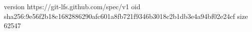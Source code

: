 version https://git-lfs.github.com/spec/v1
oid sha256:9e56f2b18c1682886290afc601a8fb721f9346b3018c2b1db3e4a94bf02e24cf
size 62547
